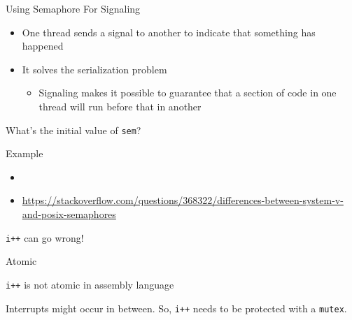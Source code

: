 \begin{frame}{Using Semaphore For Signaling}
  \begin{itemize}
  \item One thread sends a signal to another to indicate that something has
    happened
  \item It solves the serialization problem
    \begin{itemize}
    \item[] Signaling makes it possible to guarantee that a section of code in one thread
      will run before that in another
    \end{itemize}
  \end{itemize}
  \begin{center}
  \end{center}
  \begin{center}
    What's the initial value of \texttt{sem}?
  \end{center}
\end{frame}

\begin{frame}{Example}%
  \begin{center}
  \end{center}
\end{frame}

\begin{itemize}
\item {}
\item \url{https://stackoverflow.com/questions/368322/differences-between-system-v-and-posix-semaphores}
\end{itemize}

\begin{frame}{\texttt{i++} {\small can go wrong!}}
\begin{center}
\end{center}
\end{frame}

\begin{frame}{Atomic}
  \begin{block}{\texttt{i++} is not atomic in assembly language}
    \begin{center}
    \end{center}
  \end{block}
  Interrupts might occur in between. So, \texttt{i++} needs to be protected with a \texttt{mutex}.
\end{frame}

